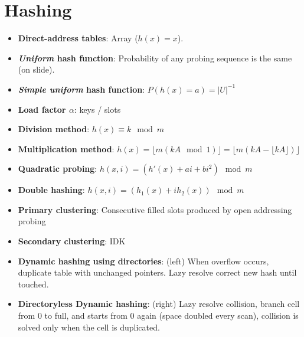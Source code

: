 \documentclass[12pt,a4paper,twoside]{article}
\theoremstyle{definition}
\theoremstyle{remark}
\begin{document}
    \section{Hashing}
    \begin{itemize}
        \item \textbf{Direct-address tables}: Array ($h(x) = x$).
        \item \textbf{\textit{Uniform} hash function}: Probability of any probing sequence is the same (on slide).
        \item \textbf{\textit{Simple uniform} hash function}: $P(h(x) = a) = |U|^{-1}$
        \item \textbf{Load factor $\alpha$}: keys / slots
        \item \textbf{Division method}: $h(x) \equiv k \mod m$
        \item \textbf{Multiplication method}: $h(x) = \lfloor m (kA \mod 1) \rfloor = \lfloor m (kA - \lfloor kA \rfloor) \rfloor$
        \item \textbf{Quadratic probing}: $h(x, i) = (h'(x) + ai + bi^2) \mod m$
        \item \textbf{Double hashing}: $h(x, i) = (h_1(x) + i h_2(x)) \mod m$
        \item \textbf{Primary clustering}: Consecutive filled slots produced by open addressing probing
        \item \textbf{Secondary clustering}: IDK
        \item \textbf{Dynamic hashing using directories}: (left) When overflow occurs, duplicate table with unchanged pointers. Lazy resolve correct new hash until touched.
        \item \textbf{Directoryless Dynamic hashing}: (right) Lazy resolve collision, branch cell from 0 to full, and starts from 0 again (space doubled every scan), collision is solved only when the cell is duplicated.


\end{itemize}
\end{document}
